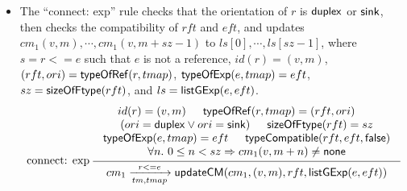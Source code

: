 \begin{itemize}
	\[
			\infer[register]
	{\seqq{ cm_1 \xrightarrow[tm, tmap]{\mbox{reg } x : t\ e\ \mbox{with: reset{\tt =>}}  (rsig, rval)}   \updatecm(cm_1, (v, 0), ft, \listgexp(x, ft))}}
	{
		\begin{array}{c}
			id(x) = v \hspace{15pt} tmap(v)= (ft, ori) \hspace{15pt} \sizeofftype(ft) = sz    \\
		rft = \typeofexp(rval, tmap)\hspace{15pt}	\forall n.\ 0 \le n < sz  \Rightarrow  cm_1(v, n) = \svnone \\
			\typecompatible(ft, rft, \lfalse) \hspace{15pt} ls = \listgexp(rval, rft)\\
			\forall n.\ 0 \le n < sz \Rightarrow  (tm(v, n) = (\register, (t_n, cl_n, rs_n, rv_n, b_n)) \hspace{15pt} rv_n = ls[n])
		\end{array}
	}
	\]
	\item The ``connect: exp'' rule checks that %
	the orientation of $r$ is ${\sf duplex}$ or ${\sf sink}$,  then checks the compatibility of $rft$ and $eft$, and updates $cm_1(v, m), \cdots, cm_1(v, m+sz-1)$ to $ls[0], \cdots, ls[sz-1]$, where $s = r <= e$ such that $e$ is not a reference, $id(r) = (v, m)$, $(rft, ori) = {\sf typeOfRef}(r, tmap)$, ${\sf typeOfExp}(e, tmap) = eft$, $sz = {\sf sizeOfFtype}(rft)$, and $ls = {\sf listGExp}(e, eft)$.
	\[
		\infer[connect: exp]
	{\seqq{ cm_1 \xrightarrow[tm, tmap]{r {\tt <=}e}  \updatecm(cm_1, (v, m), rft, \listgexp(e, eft))}}
	{
		\begin{array}{c}
			id(r)=(v, m) \hspace{15pt} \typeofref(r, tmap)= (rft, ori) \ \hspace{15pt} \\
			(ori = \duplex \vee ori = \sink) \hspace{15pt} \sizeofftype(rft) = sz  \\
		    \typeofexp(e, tmap)= eft	\hspace{15pt} \typecompatible(rft, eft, \lfalse) \\
             \forall n.\ 0 \le n < sz \Rightarrow cm_1(v, m+n) \neq \svnone
		\end{array}
	}
\]
\end{itemize}
